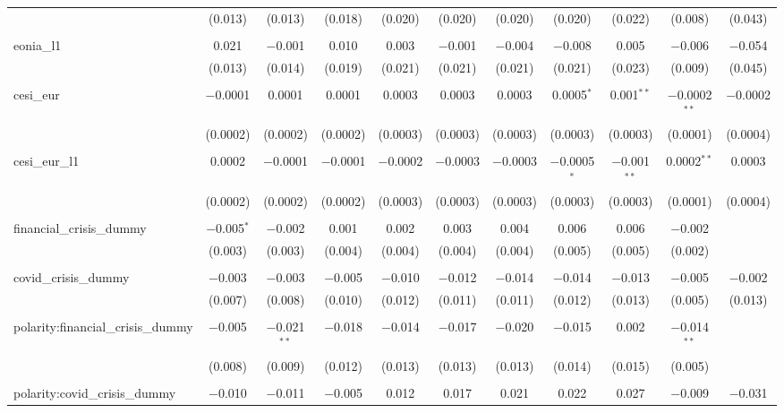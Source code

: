 \begin{table}[!htbp]
\begin{adjustbox}{width=1.25\textwidth}
\begin{tabular}{@{\extracolsep{5pt}}lcccccccccc}
  & (0.013) & (0.013) & (0.018) & (0.020) & (0.020) & (0.020) & (0.020) & (0.022) & (0.008) & (0.043) \\ 
  & & & & & & & & & & \\ 
 eonia\_l1 & 0.021 & $-$0.001 & 0.010 & 0.003 & $-$0.001 & $-$0.004 & $-$0.008 & 0.005 & $-$0.006 & $-$0.054 \\ 
  & (0.013) & (0.014) & (0.019) & (0.021) & (0.021) & (0.021) & (0.021) & (0.023) & (0.009) & (0.045) \\ 
  & & & & & & & & & & \\ 
 cesi\_eur & $-$0.0001 & 0.0001 & 0.0001 & 0.0003 & 0.0003 & 0.0003 & 0.0005$^{*}$ & 0.001$^{**}$ & $-$0.0002$^{**}$ & $-$0.0002 \\ 
  & (0.0002) & (0.0002) & (0.0002) & (0.0003) & (0.0003) & (0.0003) & (0.0003) & (0.0003) & (0.0001) & (0.0004) \\ 
  & & & & & & & & & & \\ 
 cesi\_eur\_l1 & 0.0002 & $-$0.0001 & $-$0.0001 & $-$0.0002 & $-$0.0003 & $-$0.0003 & $-$0.0005$^{*}$ & $-$0.001$^{**}$ & 0.0002$^{**}$ & 0.0003 \\ 
  & (0.0002) & (0.0002) & (0.0002) & (0.0003) & (0.0003) & (0.0003) & (0.0003) & (0.0003) & (0.0001) & (0.0004) \\ 
  & & & & & & & & & & \\ 
 financial\_crisis\_dummy & $-$0.005$^{*}$ & $-$0.002 & 0.001 & 0.002 & 0.003 & 0.004 & 0.006 & 0.006 & $-$0.002 &  \\ 
  & (0.003) & (0.003) & (0.004) & (0.004) & (0.004) & (0.004) & (0.005) & (0.005) & (0.002) &  \\ 
  & & & & & & & & & & \\ 
 covid\_crisis\_dummy & $-$0.003 & $-$0.003 & $-$0.005 & $-$0.010 & $-$0.012 & $-$0.014 & $-$0.014 & $-$0.013 & $-$0.005 & $-$0.002 \\ 
  & (0.007) & (0.008) & (0.010) & (0.012) & (0.011) & (0.011) & (0.012) & (0.013) & (0.005) & (0.013) \\ 
  & & & & & & & & & & \\ 
 polarity:financial\_crisis\_dummy & $-$0.005 & $-$0.021$^{**}$ & $-$0.018 & $-$0.014 & $-$0.017 & $-$0.020 & $-$0.015 & 0.002 & $-$0.014$^{**}$ &  \\ 
  & (0.008) & (0.009) & (0.012) & (0.013) & (0.013) & (0.013) & (0.014) & (0.015) & (0.005) &  \\ 
  & & & & & & & & & & \\ 
 polarity:covid\_crisis\_dummy & $-$0.010 & $-$0.011 & $-$0.005 & 0.012 & 0.017 & 0.021 & 0.022 & 0.027 & $-$0.009 & $-$0.031 \\ 

\end{tabular}
\end{adjustbox}
\end{table}
